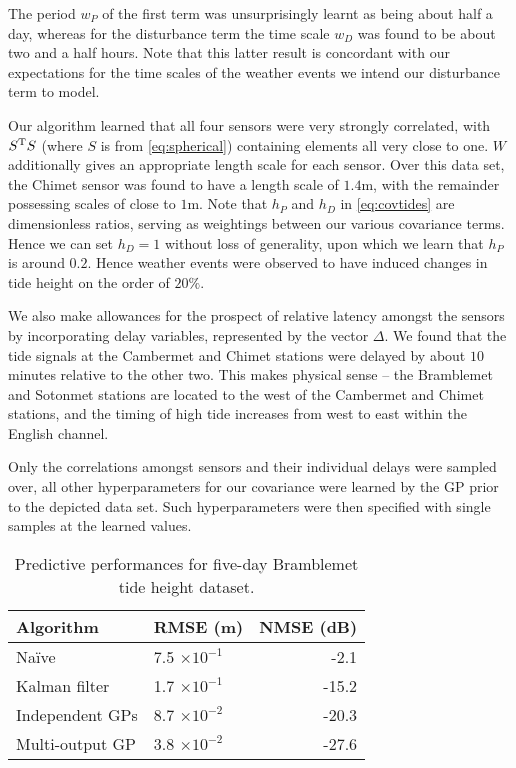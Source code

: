 \documentclass{acmsmall}
\newcommand{\dnt}[1]{_{{#1}}}
\begin{document}
The period $w_P$ of the first term was unsurprisingly learnt as being about half a day, whereas for the disturbance term the time scale $w\dnt{D}$ was found to be about two and a half hours. Note that this latter result is concordant with our expectations for the time scales of the weather events we intend our disturbance term to model. 

Our algorithm learned that all four sensors were very strongly correlated, with $S^{\mathrm{T}} S$ (where $S$ is from \eqref{eq:spherical})  containing elements all very close to one. $W$ additionally gives an appropriate length scale for each sensor. Over this data set, the Chimet sensor was found to have a length scale of $1.4$m, with the remainder possessing scales of close to $1$m. Note that $h\dnt{P}$ and $h\dnt{D}$ in \eqref{eq:covtides} are dimensionless ratios, serving as weightings between our various covariance terms. Hence we can set $h\dnt{D}=1$ without loss of generality, upon which we learn that $h\dnt{P}$ is around $0.2$. Hence weather events were observed to have induced changes in tide height on the order of $20\%$.

We also make allowances for the prospect of relative latency amongst the sensors by incorporating delay variables, represented by the vector $\Delta$. We found that the tide signals at the Cambermet and Chimet stations were delayed by about $10$ minutes relative to the other two. This makes physical sense -- the Bramblemet and Sotonmet stations are located to the west of the Cambermet and Chimet stations, and the timing of high tide increases from west to east within the English channel.

Only the correlations amongst sensors and their individual delays were sampled over, all other hyperparameters for our covariance were learned by the GP prior to the depicted data set. Such hyperparameters were then specified with single samples at the learned values.

\begin{table}
\centering
\caption{Predictive performances for five-day Bramblemet tide height dataset.}
\label{tbl:TH_RMSEs}
 \begin{tabular}{@{}llr@{}}
 \\
 \toprule
Algorithm & RMSE (m) & NMSE (dB)\\
\midrule
Na\"{i}ve & 7.5 $\times 10^{-1}$ & -2.1 \\
Kalman filter & 1.7 $\times 10^{-1}$ & -15.2 \\
Independent GPs & 8.7 $\times 10^{-2}$ & -20.3 \\
Multi-output GP & 3.8 $\times 10^{-2}$ & -27.6 \\
\bottomrule
\end{tabular}
\end{table}
\end{document}
